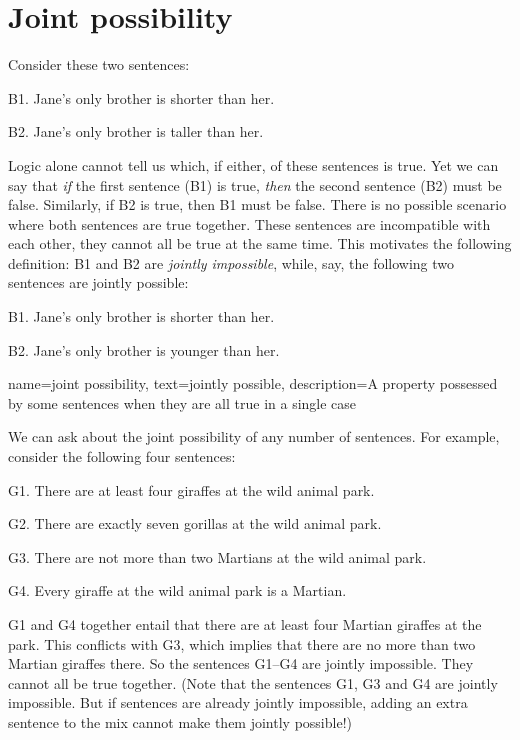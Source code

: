 
\section{Joint possibility}

Consider these two sentences:
	\begin{compactlist}
		\item[B1.] Jane's only brother is shorter than her.
		\item[B2.] Jane's only brother is taller than her.
	\end{compactlist}
Logic alone cannot tell us which, if either, of these sentences is true. Yet we can say that \emph{if} the first sentence (B1) is true, \emph{then} the second sentence (B2) must be false. Similarly, if B2 is true, then B1 must be false. There is no possible scenario where both sentences are true together. These sentences are incompatible with each other, they cannot all be true at the same time. This motivates the following definition:
B1 and B2 are \emph{jointly impossible}, while, say, the following two sentences are jointly possible:
	\begin{compactlist}
		\item[B1.] Jane's only brother is shorter than her.
		\item[B2.] Jane's only brother is younger than her.
	\end{compactlist}

{
name=joint possibility,
text={jointly possible},
description={A property possessed by some sentences when they are all true in a single case}
}

We can ask about the joint possibility of any number of sentences. For example, consider the following four sentences:
	\begin{compactlist}	
		\item[G1.] \label{MartianGiraffes} There are at least four giraffes at the wild animal park.
		\item[G2.] There are exactly seven gorillas at the wild animal park.
		\item[G3.] There are not more than two Martians at the wild animal park.
		\item[G4.] Every giraffe at the wild animal park is a Martian.
	\end{compactlist}
G1 and G4 together entail that there are at least four Martian
giraffes at the park. This conflicts with G3, which implies that there
are no more than two Martian giraffes there. So the sentences G1--G4
are jointly impossible. They cannot all be true together. (Note that
the sentences G1, G3 and G4 are jointly impossible. But if sentences
are already jointly impossible, adding an extra sentence to the mix
cannot make them jointly possible!)

